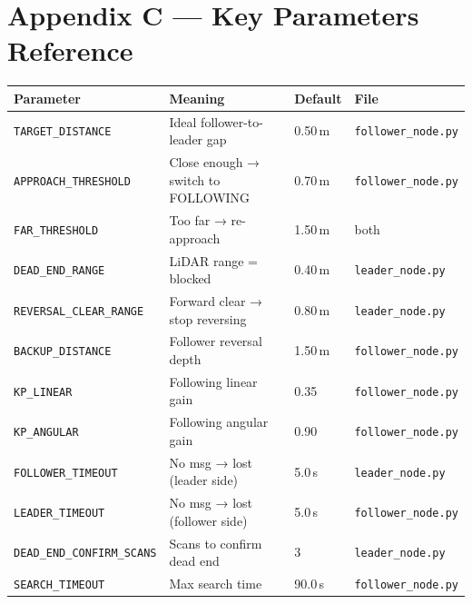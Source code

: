 \documentclass[11pt, a4paper]{article}
\begin{document}
\section*{Appendix C — Key Parameters Reference}

\begin{center}
\begin{tabularx}{0.96\textwidth}{lXll}
\toprule
\textbf{Parameter} & \textbf{Meaning} & \textbf{Default} & \textbf{File} \\
\midrule
\texttt{TARGET\_DISTANCE}        & Ideal follower-to-leader gap        & 0.50\,m & \texttt{follower\_node.py} \\
\texttt{APPROACH\_THRESHOLD}     & Close enough → switch to FOLLOWING  & 0.70\,m & \texttt{follower\_node.py} \\
\texttt{FAR\_THRESHOLD}          & Too far → re-approach               & 1.50\,m & both \\
\texttt{DEAD\_END\_RANGE}        & LiDAR range = blocked               & 0.40\,m & \texttt{leader\_node.py} \\
\texttt{REVERSAL\_CLEAR\_RANGE}  & Forward clear → stop reversing      & 0.80\,m & \texttt{leader\_node.py} \\
\texttt{BACKUP\_DISTANCE}        & Follower reversal depth             & 1.50\,m & \texttt{follower\_node.py} \\
\texttt{KP\_LINEAR}              & Following linear gain               & 0.35    & \texttt{follower\_node.py} \\
\texttt{KP\_ANGULAR}             & Following angular gain              & 0.90    & \texttt{follower\_node.py} \\
\texttt{FOLLOWER\_TIMEOUT}       & No msg → lost (leader side)         & 5.0\,s  & \texttt{leader\_node.py} \\
\texttt{LEADER\_TIMEOUT}         & No msg → lost (follower side)       & 5.0\,s  & \texttt{follower\_node.py} \\
\texttt{DEAD\_END\_CONFIRM\_SCANS} & Scans to confirm dead end         & 3       & \texttt{leader\_node.py} \\
\texttt{SEARCH\_TIMEOUT}         & Max search time                     & 90.0\,s & \texttt{follower\_node.py} \\
\bottomrule
\end{tabularx}
\end{center}
\end{document}
